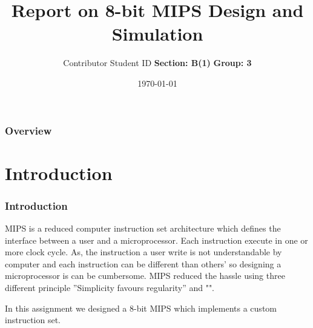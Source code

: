 \documentclass[8pt, light]{oist_presentation}
\title[Short title]{\color{\templatecolor} 
Report on 8-bit MIPS Design and Simulation
}
\author{Contributor Student ID \linebreak \linebreak 1705068 \linebreak 1705069 \linebreak 1705070 \linebreak 1705071 \linebreak 1705074 \linebreak \linebreak  \textbf{Section: B(1)} \linebreak \textbf{Group: 3}} %
\date{\today} %
\begin{document}

\begin{frame}[plain]
\vspace*{1.55cm}
\end{frame}


\begin{frame}
\frametitle{Overview}
\tableofcontents
\end{frame}


\section{Introduction}

\begin{frame}
\frametitle{Introduction}
    MIPS is a reduced computer instruction set architecture which defines the
interface between a user and a microprocessor. Each instruction execute in one or more clock cycle. As, the instruction a user write is not understandable by computer and each instruction can be different than others' so designing a microprocessor is can be cumbersome. MIPS reduced the hassle using three different principle ”Simplicity favours regularity” and "".
\linebreak

    In this assignment we designed a 8-bit MIPS which implements a custom
instruction set.

\end{frame}

\end{document}
